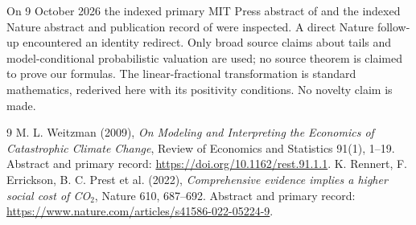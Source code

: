 \documentclass[11pt]{article}
\begin{document}
On 9 October 2026 the indexed primary MIT Press abstract of \cite{W} and
the indexed Nature abstract and publication record of \cite{R} were
inspected. A direct Nature follow-up encountered an identity redirect.
Only broad source claims about tails and model-conditional probabilistic
valuation are used; no source theorem is claimed to prove our formulas.
The linear-fractional transformation is standard mathematics, rederived
here with its positivity conditions. No novelty claim is made.
\begin{thebibliography}{9}
 M. L. Weitzman (2009), \emph{On Modeling and Interpreting the
Economics of Catastrophic Climate Change}, Review of Economics and
Statistics 91(1), 1--19. Abstract and primary record:
\url{https://doi.org/10.1162/rest.91.1.1}.
 K. Rennert, F. Errickson, B. C. Prest et al. (2022),
\emph{Comprehensive evidence implies a higher social cost of CO$_2$},
Nature 610, 687--692. Abstract and primary record:
\url{https://www.nature.com/articles/s41586-022-05224-9}.
\end{thebibliography}
\end{document}

